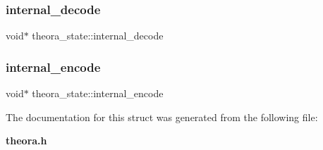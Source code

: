 \mbox{\label{structtheora__state_ad20c4eebbc5ed9764cf03ba8b90e796e}} 
\subsubsection{internal\+\_\+decode}
{\footnotesize\ttfamily void$\ast$ theora\+\_\+state\+::internal\+\_\+decode}

\mbox{\label{structtheora__state_a1fbfd82fb7210cbcc4233cb680ec2af6}} 
\subsubsection{internal\+\_\+encode}
{\footnotesize\ttfamily void$\ast$ theora\+\_\+state\+::internal\+\_\+encode}



The documentation for this struct was generated from the following file\+:\begin{DoxyCompactItemize}
\item 
\textbf{ theora.\+h}\end{DoxyCompactItemize}
